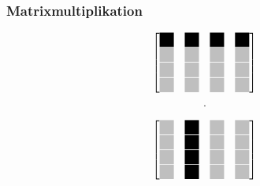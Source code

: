 \begin{frame}\frametitle{Matrixmultiplikation}
 \begin{center}
 \begin{figure}[ht!]
 \centering
\begin{minipage}{0.2\textwidth}
 \begingroup
 \renewcommand*{\arraystretch}{1.1} %
 \renewcommand*{\arraycolsep}{0.6pt} %

 \[
    \begin{bmatrix}
    \tikzmark{varrowtopleft} \myBlackBox  	& \myBlackBox 		& \myBlackBox 		& \tikzmark{varrowtopright} \myBlackBox \\
                             \myLightgrayBox 	& \myLightgrayBox 	& \myLightgrayBox 	& \myLightgrayBox \\
                             \myLightgrayBox 	& \myLightgrayBox	& \myLightgrayBox	& \myLightgrayBox \\
    \tikzmark{varrowbottom}  \myLightgrayBox 	& \myLightgrayBox 	& \myLightgrayBox 	& \myLightgrayBox 
   \end{bmatrix}
 \]
 \endgroup
\end{minipage}
\begin{minipage}{0.1\textwidth}
 \hspace{-.5cm}
 \[
  \cdot
 \]
\end{minipage}
\begin{minipage}{0.2\textwidth}
 \begingroup
 \renewcommand*{\arraystretch}{1.1} %
 \renewcommand*{\arraycolsep}{0.6pt} %
 \[
   \begin{bmatrix}
    \tikzmark{varrowtopleft} \myLightgrayBoxHigh & \myBlackBoxHigh & \myLightgrayBoxHigh & \tikzmark{varrowtopright} \myLightgrayBoxHigh \\
                             \myLightgrayBoxHigh & \myBlackBoxHigh & \myLightgrayBoxHigh & \myLightgrayBoxHigh \\
                             \myLightgrayBoxHigh & \myBlackBoxHigh & \myLightgrayBoxHigh & \myLightgrayBoxHigh \\
    \tikzmark{varrowbottom}  \myLightgrayBoxHigh & \myBlackBoxHigh & \myLightgrayBoxHigh & \myLightgrayBoxHigh 
   \end{bmatrix}
 \]
 \endgroup
\end{minipage}
\end{figure}
\end{center}
\end{frame}
